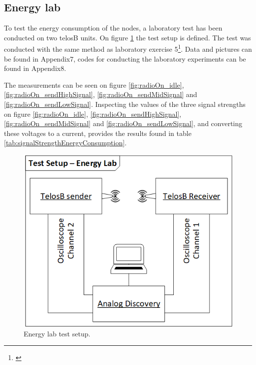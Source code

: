 \subsection{Energy lab}\label{sc:energylab}

To test the energy consumption of the nodes, a laboratory test has been conducted on two telosB units. On figure \ref{fig:energyLab_testSetup} the test setup is defined. The test was conducted with the same method as laboratory exercise 5\footnote{\cite{Madsen}}. Data and pictures can be found in Appendix7, codes for conducting the laboratory experiments can be found in Appendix8.

\noindent The measurements can be seen on figure \ref{fig:radioOn_idle}, \ref{fig:radioOn_sendHighSignal}, \ref{fig:radioOn_sendMidSignal} and \ref{fig:radioOn_sendLowSignal}. Inspecting the values of the three signal strengths on figure \ref{fig:radioOn_idle}, \ref{fig:radioOn_sendHighSignal}, \ref{fig:radioOn_sendMidSignal} and \ref{fig:radioOn_sendLowSignal}, and converting these voltages to a current, provides the results found in table \ref{tab:signalStrengthEnergyConsumption}.

\begin{figure}[H]
	\centering
	\includegraphics[width=1\linewidth]{implementation/energylab/fig/energyLab_testSetup.png}
	\caption{Energy lab test setup.}
	\label{fig:energyLab_testSetup}
\end{figure}

